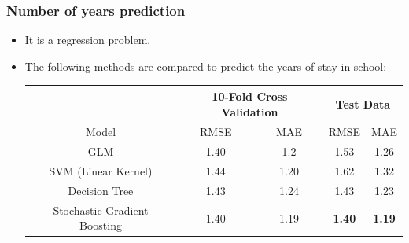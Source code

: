 \documentclass[aspectratio=169]{beamer}
\begin{document}
\begin{frame}
\frametitle{Number of years prediction}

\begin{itemize}
  \item It is a regression problem.
  \item The following methods are compared to predict the years of stay in
school:

\begin{table}[H]
\centering
\small
\label{num_year}
\begin{tabular}{|c|c|c|c|c|} \hline
    & \multicolumn{2}{c|}{10-Fold Cross Validation} &
\multicolumn{2}{c|}{Test Data} \\ \hline
Model                        & RMSE                  & MAE                   &
RMSE           & MAE           \\ \hline
GLM                          & 1.40                  & 1.2                   &
1.53           & 1.26          \\ \hline
SVM (Linear Kernel)           & 1.44                  & 1.20                  &
1.62           & 1.32          \\ \hline
Decision Tree                         & 1.43                  & 1.24        &
1.43           & 1.23          \\ \hline
Stochastic Gradient Boosting & 1.40                  & 1.19                  &
\textbf{1.40}           & \textbf{1.19}    \\
\hline
\end{tabular}
\end{table}

\end{itemize}

\end{frame}
\end{document}
